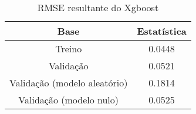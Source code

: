 
\begin{table}[h]
\centering
\caption{RMSE resultante do Xgboost}
\label{tab:cap3_rmse_xgboost}
\begin{tabular}{cc}
Base & Estatística \\
\hline
Treino & 0.0448 \\
Validação & 0.0521 \\
Validação (modelo aleatório) & 0.1814 \\
Validação (modelo nulo) & 0.0525 \\
\hline
\end{tabular}

\end{table}

